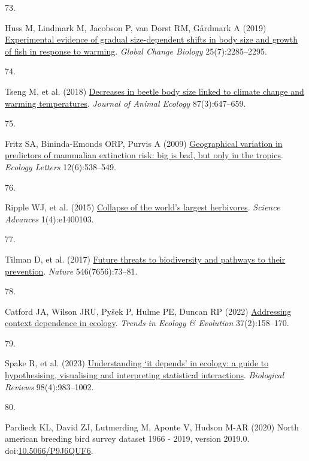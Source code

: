 \documentclass{article}
\newlength{\cslhangindent}
\newlength{\csllabelwidth}
\newlength{\cslentryspacingunit} %
\newenvironment{CSLReferences}[2] %
 {%
  \setlength{\parindent}{0pt}
  \ifodd #1
  \let\oldpar\par
  \def\par{\hangindent=\cslhangindent\oldpar}
  \fi
  \setlength{\parskip}{#2\cslentryspacingunit}
 }%
 {}
\newcommand{\CSLLeftMargin}[1]{\parbox[t]{\csllabelwidth}{#1}}
\newcommand{\CSLRightInline}[1]{\parbox[t]{\linewidth - \csllabelwidth}{#1}\break}
\begin{document}
\begin{CSLReferences}{0}{0}
\leavevmode{}%
\CSLLeftMargin{73. }%
\CSLRightInline{Huss M, Lindmark M, Jacobson P, van Dorst RM, Gårdmark A
(2019) \href{https://doi.org/10.1111/gcb.14637}{Experimental evidence of
gradual size-dependent shifts in body size and growth of fish in
response to warming}. \emph{Global Change Biology} 25(7):2285--2295.}

\leavevmode{}%
\CSLLeftMargin{74. }%
\CSLRightInline{Tseng M, et al. (2018)
\href{https://doi.org/10.1111/1365-2656.12789}{Decreases in beetle body
size linked to climate change and warming temperatures}. \emph{Journal
of Animal Ecology} 87(3):647--659.}

\leavevmode{}%
\CSLLeftMargin{75. }%
\CSLRightInline{Fritz SA, Bininda-Emonds ORP, Purvis A (2009)
\href{https://doi.org/10.1111/j.1461-0248.2009.01307.x}{Geographical
variation in predictors of mammalian extinction risk: big is bad, but
only in the tropics}. \emph{Ecology Letters} 12(6):538--549.}

\leavevmode{}%
\CSLLeftMargin{76. }%
\CSLRightInline{Ripple WJ, et al. (2015)
\href{https://doi.org/10.1126/sciadv.1400103}{Collapse of the world{'}s
largest herbivores}. \emph{Science Advances} 1(4):e1400103.}

\leavevmode{}%
\CSLLeftMargin{77. }%
\CSLRightInline{Tilman D, et al. (2017)
\href{https://doi.org/10.1038/nature22900}{Future threats to
biodiversity and pathways to their prevention}. \emph{Nature}
546(7656):73--81.}

\leavevmode{}%
\CSLLeftMargin{78. }%
\CSLRightInline{Catford JA, Wilson JRU, Pyšek P, Hulme PE, Duncan RP
(2022) \href{https://doi.org/10.1016/j.tree.2021.09.007}{Addressing
context dependence in ecology}. \emph{Trends in Ecology \& Evolution}
37(2):158--170.}

\leavevmode{}%
\CSLLeftMargin{79. }%
\CSLRightInline{Spake R, et al. (2023)
\href{https://doi.org/10.1111/brv.12939}{Understanding {`}it depends{'}
in ecology: a guide to hypothesising, visualising and interpreting
statistical interactions}. \emph{Biological Reviews} 98(4):983--1002.}

\leavevmode{}%
\CSLLeftMargin{80. }%
\CSLRightInline{Pardieck KL, David ZJ, Lutmerding M, Aponte V, Hudson
M-AR (2020) North american breeding bird survey dataset 1966 - 2019,
version 2019.0.
doi:\href{https://doi.org/10.5066/P9J6QUF6}{10.5066/P9J6QUF6}.}


\end{CSLReferences}
\end{document}
